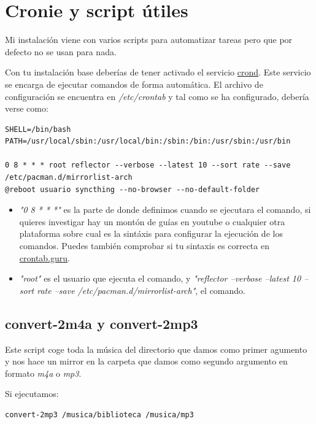 \documentclass[12pt]{article}
\begin{document}
\section{Cronie y script útiles}

Mi instalación viene con varios scripts para automatizar tareas pero que por defecto no se usan para nada.

Con tu instalación base deberías de tener activado el servicio \href{https://wiki.archlinux.org/title/cron}{crond}. Este servicio se encarga de ejecutar comandos de forma automática. El archivo de configuración se encuentra en \emph{/etc/crontab} y tal como se ha configurado, debería verse como:


\begin{lstlisting}[basicstyle=\scriptsize\ttfamily]
SHELL=/bin/bash
PATH=/usr/local/sbin:/usr/local/bin:/sbin:/bin:/usr/sbin:/usr/bin

0 8 * * * root reflector --verbose --latest 10 --sort rate --save /etc/pacman.d/mirrorlist-arch
@reboot usuario syncthing --no-browser --no-default-folder
\end{lstlisting}

\begin{itemize}
\setlength\itemsep{-0.2em}
\item \emph{"0 8 * * *"} es la parte de donde definimos cuando se ejecutara el comando, si quieres investigar hay un montón de guías en youtube o cualquier otra plataforma sobre cual es la sintáxis para configurar la ejecución de los comandos. Puedes también comprobar si tu sintaxis es correcta en \href{https://crontab.guru/}{crontab.guru}.
\item \emph{"root"} es el usuario que ejecuta el comando, y \emph{"reflector --verbose --latest 10 --sort rate --save /etc/pacman.d/mirrorlist-arch"}, el comando.
\end{itemize}

\subsection{convert-2m4a y convert-2mp3}

Este script coge toda la música del directorio que damos como primer agumento y nos hace un mirror en la carpeta que damos como segundo argumento en formato \emph{m4a} o \emph{mp3}.

Si ejecutamos:
\begin{verbatim}
convert-2mp3 /musica/biblioteca /musica/mp3
\end{verbatim}
\end{document}
